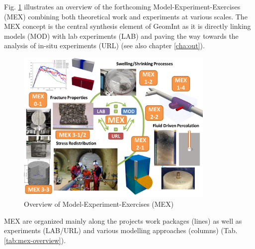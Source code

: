 Fig. \ref{fig:mex-overview} illustrates an overview of the forthcoming Model-Experiment-Exercises (MEX) combining both theoretical work and experiments at various scales.
The MEX concept is the central synthesis element of GeomInt as it is directly linking models (MOD) with lab experiments (LAB) and paving the way towards the analysis of in-situ experiments (URL) (see also chapter \ref{cha:out}).

\clearpage

\begin{figure}[!ht]
\centering
\includegraphics[width=0.85\textwidth]{figures/geomint-mex-overview.png}
\caption{Overview of Model-Experiment-Exercises (MEX)}
\label{fig:mex-overview}
\end{figure}

MEX are organized mainly along the projects work packages (lines) as well as experiments (LAB/URL) and various modelling approaches (columns) (Tab. \ref{tab:mex-overview}).

